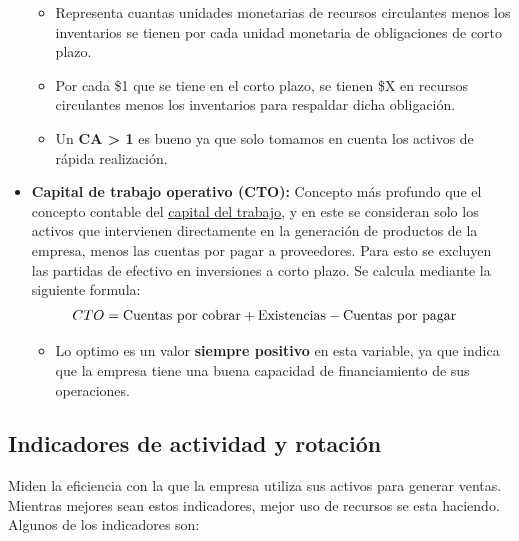 \documentclass{templateNote}
\begin{document}
\begin{itemize}
    \begin{itemize}
        \item Representa cuantas unidades monetarias de recursos circulantes menos los inventarios se tienen por cada unidad monetaria de obligaciones de corto plazo.
        \item Por cada \$1 que se tiene en el corto plazo, se tienen \$X en recursos circulantes menos los inventarios para respaldar dicha obligación.
        \item Un \textbf{CA > 1} es bueno ya que solo tomamos en cuenta los activos de rápida realización.
    \end{itemize}

    \item\textbf{Capital de trabajo operativo (CTO):}
    \noindent Concepto más profundo que el concepto contable del \hyperref[sec:Capital neto del trabajo (CNT)]{capital del trabajo}, y en este se consideran solo los activos que intervienen directamente
    en la generación de productos de la empresa, menos las cuentas por pagar a proveedores. Para esto se excluyen las partidas de efectivo en inversiones a corto plazo. Se calcula mediante la siguiente formula:
    \begin{align*}
        CTO &= \textnormal{Cuentas por cobrar} + \textnormal{Existencias} - \textnormal{Cuentas por pagar}
    \end{align*}

    \begin{itemize}
        \item Lo optimo es un valor \textbf{siempre positivo} en esta variable, ya que indica que la empresa tiene una buena capacidad de financiamiento de sus operaciones.
    \end{itemize}
\end{itemize}

\subsection{Indicadores de actividad y rotación}
\noindent Miden la eficiencia con la que la empresa utiliza sus activos para generar ventas. Mientras mejores sean estos indicadores, mejor uso de recursos se esta haciendo. Algunos de los indicadores son:
\end{document}

